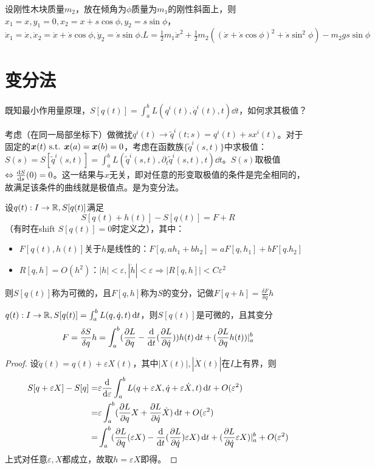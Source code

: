 \documentclass{ctexbook}
\begin{document}
\begin{Eg}
  设刚性木块质量$m_{2}$，放在倾角为$\phi$质量为$m_{1}$的刚性斜面上，则$x_{1}=x,y_{1}=0,x_{2}=x+s\cos\phi,y_{2}=s\sin\phi$，$\dot x_{1}=\dot x,\dot x_{2}=\dot x+\dot s\cos\phi,\dot y_{2}=\dot s\sin\phi.L=\frac{1}{2}m_{1}\dot x^{2}+\frac{1}{2}m_{2}((\dot x+\dot s\cos\phi)^{2}+\dot s\sin^{2}\phi)-m_{2}gs\sin\phi$
\end{Eg}

\section{变分法}

既知最小作用量原理，$S[q(t)]=\int_{a}^{b}L(q^{i}(t),\dot q^{i}(t),t)\dd t$，如何求其极值？

考虑（在同一局部坐标下）做微扰$q^{i}(t)\to \tilde q^{i}(t;s)=q^{i}(t)+sx^{i}(t)$。对于固定的$\bm x(t)\text{ s.t. } \bm x(a)=\bm x(b)=0$，考虑在函数族$\{\tilde{q}^{i}(s,t)\}$中求极值：$S(s)=S[\tilde q^{i}(s,t)]=\int_{a}^{b}L(\tilde q^{i}(s,t),\partial_{t}\tilde{q}^{i}(s,t),t)\dd t$。$S(s)$取极值$\Leftrightarrow \frac{\mathrm{d}S}{\mathrm{d}s}(0)=0$。这一结果与$x$无关，即对任意的形变取极值的条件是完全相同的，故满足该条件的曲线就是极值点。是为变分法。


\begin{Def}[变分]
  设$q(t):I\to\mathbb{R}, S[q(t)]$满足
  \[S[q(t)+h(t)]-S[q(t)]=F+R\]
  （有时在shift $S[q(t)]=0$时定义之），其中：
  \begin{itemize}
  \item $F[q(t),h(t)]$关于$h$是线性的：$F[q,ah_{1}+bh_{2}]=aF[q,h_{1}]+bF[q.h_{2}]$
  \item $R[q,h]=O(h^{2})$：$|h|<\varepsilon,|\dot h|<\varepsilon\Rightarrow |R[q,h]|<C\varepsilon^{2}$
    \end{itemize}则$S[q(t)]$称为可微的，且$F[q,h]$称为$S$的变分，记做$F[q+h]=\frac{\delta F}{\delta q}h$
\end{Def}

\begin{Thm}
  $q(t):I\to\mathbb{R},S[q(t)]=\int_{a}^{b}L(q,\dot q,t)\,\mathrm{d} t$，则$S[q(t)]$是可微的，且其变分
  \[F=\frac{\delta S}{\delta q}h=\int_{a}^{b}(\frac{\partial L}{\partial q}-\frac{\mathrm{d}}{\mathrm{d}t}(\frac{\partial L}{\partial \dot q}))h(t)\,\mathrm{d} t+(\frac{\partial L}{\partial q}h(t))|_{a}^{b}\]
\end{Thm}

\begin{proof}
  设$\tilde q(t)=q(t)+\varepsilon X(t)$，其中$|X(t)|,|\dot X(t)|$在$I$上有界，则
  \begin{align*}
    S[q+\varepsilon X]-S[q]=&\varepsilon\frac{\mathrm{d}}{\mathrm{d}\varepsilon}\int_{a}^{b}L(q+\varepsilon X,\dot q+\varepsilon \dot{X},t)\,\mathrm{d} t+O(\varepsilon^{2})\\
    =&\varepsilon\int_{a}^{b}(\frac{\partial L}{\partial q}X+\frac{\partial L}{\partial \dot q}\dot X)\,\mathrm{d} t+O(\varepsilon^{2})\\
    =&\int_{a}^{b}(\frac{\partial L}{\partial q}(\varepsilon X)-\frac{\mathrm{d}}{\mathrm{d}t}(\frac{\partial L}{\partial \dot q})\varepsilon X)\,\mathrm{d} t+(\frac{\partial L}{\partial \dot q}\varepsilon X)|_{a}^{b}+O(\varepsilon^{2})
    \end{align*}
  上式对任意$\varepsilon,X$都成立，故取$h=\varepsilon X$即得。
\end{proof}
\end{document}
